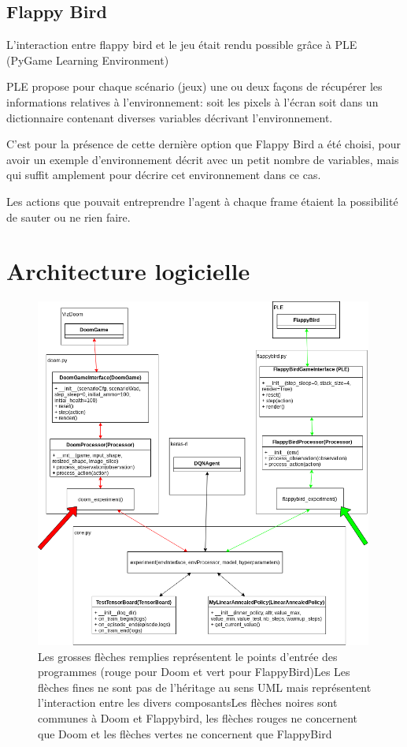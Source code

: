 \documentclass[a4paper,10pt,openany,oneside]{report}
\begin{document}
\subsection{Flappy Bird}
L'interaction entre flappy bird et le jeu était rendu possible grâce à PLE (PyGame Learning Environment) \cite[]{tasfi2016PLE}

PLE propose pour chaque scénario (jeux) une ou deux façons de récupérer les informations relatives à l'environnement: soit les pixels à l'écran soit dans un dictionnaire contenant diverses variables décrivant l'environnement.

C'est pour la présence de cette dernière option que Flappy Bird a été choisi, pour avoir un exemple d'environnement décrit avec un petit nombre de variables, mais qui suffit amplement pour décrire cet environnement dans ce cas.

Les actions que pouvait entreprendre l'agent à chaque frame étaient la possibilité de sauter ou ne rien faire.
\section{Architecture logicielle}
\begin{figure}[H]
	\centering
	\includegraphics[width=0.99\textwidth]{img/classes.png}
	\caption{Les grosses flèches remplies représentent le points d'entrée des programmes (rouge pour Doom et vert pour FlappyBird)\hspace{\textwidth}Les Les flèches fines ne sont pas de l'héritage au sens UML mais représentent l'interaction entre les divers composants\hspace{\textwidth}Les flèches noires sont communes à Doom et Flappybird, les flèches rouges ne concernent que Doom et les flèches vertes ne concernent que FlappyBird}
\end{figure}
\end{document}
